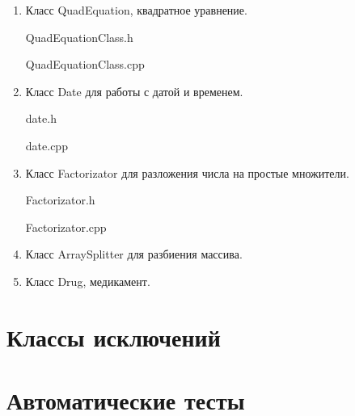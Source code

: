 \documentclass[12pt,a4paper]{report}
\begin{document}
\begin{enumerate}
	\item Класс QuadEquation, квадратное уравнение.
	
	QuadEquationClass.h
%	
	
	\vspace{\baselineskip}
	
	QuadEquationClass.cpp
%	
	
	\item Класс Date для работы с датой и временем.
	
	date.h
%	
	
	\vspace{\baselineskip}
	
	date.cpp
%	
	
	\item Класс Factorizator для разложения числа на простые множители.
	
	Factorizator.h
%	
	
	\vspace{\baselineskip}
	
	Factorizator.cpp
%	
	
	\item Класс ArraySplitter для разбиения массива.
	
%	
	
%	
	
	\item Класс Drug, медикамент.
		
%	
	
%	
	
\end{enumerate}

\section{Классы исключений}
%		
\section{Автоматические тесты}

%	
	
	
%	
\end{document}
